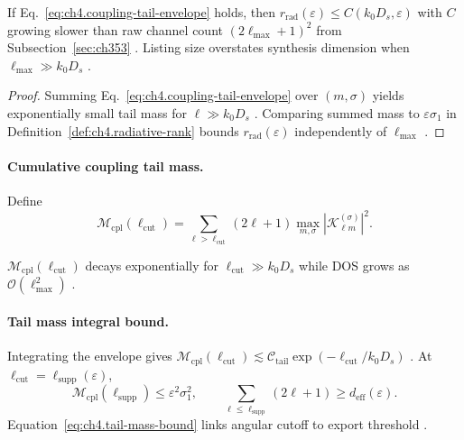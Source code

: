 \begin{theorem}
\label{thm:ch4.coupling-tail-compression}
If Eq.~\eqref{eq:ch4.coupling-tail-envelope} holds, then
\(r_{\mathrm{rad}}(\varepsilon)\le C(k_{0}D_{s},\varepsilon)\) with \(C\) growing slower than raw channel count \((2\ell_{\max}+1)^{2}\)
from Subsection~\ref{sec:ch353} \cite{hansen1988,stratton1941,harrington2001}. Listing size overstates synthesis dimension when
\(\ell_{\max}\gg k_{0}D_{s}\) \cite{devaney2004}.
\end{theorem}
\begin{proof}
Summing Eq.~\eqref{eq:ch4.coupling-tail-envelope} over \((m,\sigma)\) yields exponentially small tail mass for \(\ell\gg k_{0}D_{s}\)
\cite{hansen1988}. Comparing summed mass to \(\varepsilon\sigma_{1}\) in Definition~\ref{def:ch4.radiative-rank} bounds
\(r_{\mathrm{rad}}(\varepsilon)\) independently of \(\ell_{\max}\) \cite{harrington2001,stratton1941}.
\end{proof}

\paragraph{Cumulative coupling tail mass.}
Define
\begin{equation}
\label{eq:ch4.coupling-tail-mass}
\mathcal{M}_{\mathrm{cpl}}(\ell_{\mathrm{cut}})=\sum_{\ell>\ell_{\mathrm{cut}}}(2\ell+1)\max_{m,\sigma}|\mathcal{K}_{\ell m}^{(\sigma)}|^{2}.
\end{equation}
\begin{proposition}
\label{prop:ch4.coupling-tail-dos}
\(\mathcal{M}_{\mathrm{cpl}}(\ell_{\mathrm{cut}})\) decays exponentially for \(\ell_{\mathrm{cut}}\gg k_{0}D_{s}\) while DOS grows as
\(\mathcal{O}(\ell_{\max}^{2})\) \cite{hansen1988,stratton1941,harrington2001}.
\end{proposition}

\paragraph{Tail mass integral bound.}
Integrating the envelope gives \(\mathcal{M}_{\mathrm{cpl}}(\ell_{\mathrm{cut}})\lesssim\mathcal{C}_{\mathrm{tail}}\exp(-\ell_{\mathrm{cut}}/k_{0}D_{s})\)
\cite{hansen1988,stratton1941}. At \(\ell_{\mathrm{cut}}=\ell_{\mathrm{supp}}(\varepsilon)\),
\begin{equation}
\label{eq:ch4.tail-mass-bound}
\mathcal{M}_{\mathrm{cpl}}(\ell_{\mathrm{supp}})\le\varepsilon^{2}\sigma_{1}^{2},\qquad
\sum_{\ell\le\ell_{\mathrm{supp}}}(2\ell+1)\ge d_{\mathrm{eff}}(\varepsilon).
\end{equation}
Equation~\eqref{eq:ch4.tail-mass-bound} links angular cutoff to export threshold \cite{harrington2001,devaney2004}.


